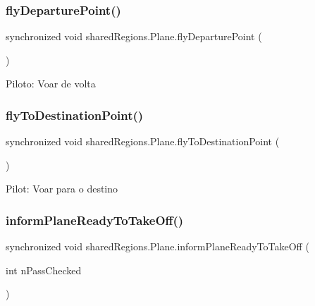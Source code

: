 \subsubsection{\texorpdfstring{fly\+Departure\+Point()}{flyDeparturePoint()}}
{\footnotesize\ttfamily synchronized void shared\+Regions.\+Plane.\+fly\+Departure\+Point (\begin{DoxyParamCaption}{ }\end{DoxyParamCaption})\hspace{0.3cm}{\ttfamily [inline]}}

Piloto\+: Voar de volta \mbox{\label{classshared_regions_1_1_plane_a14092728e37c693cce80f31c0096e467}} 
\subsubsection{\texorpdfstring{fly\+To\+Destination\+Point()}{flyToDestinationPoint()}}
{\footnotesize\ttfamily synchronized void shared\+Regions.\+Plane.\+fly\+To\+Destination\+Point (\begin{DoxyParamCaption}{ }\end{DoxyParamCaption})\hspace{0.3cm}{\ttfamily [inline]}}

Pilot\+: Voar para o destino \mbox{\label{classshared_regions_1_1_plane_adee39c6d4cc4151349e9b3f9dd9c8f9e}} 
\subsubsection{\texorpdfstring{inform\+Plane\+Ready\+To\+Take\+Off()}{informPlaneReadyToTakeOff()}}
{\footnotesize\ttfamily synchronized void shared\+Regions.\+Plane.\+inform\+Plane\+Ready\+To\+Take\+Off (\begin{DoxyParamCaption}\item[{int}]{n\+Pass\+Checked }\end{DoxyParamCaption})\hspace{0.3cm}{\ttfamily [inline]}}

